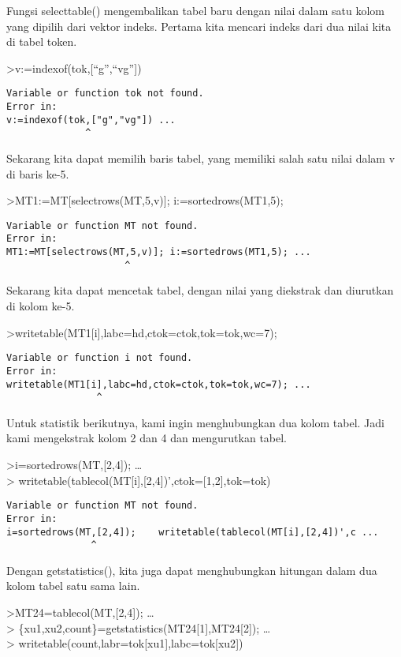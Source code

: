 \documentclass[
]{book}
\begin{document}
Fungsi selecttable() mengembalikan tabel baru dengan nilai dalam satu kolom yang dipilih dari vektor indeks. Pertama kita mencari indeks dari dua nilai kita di tabel token.

\textgreater v:=indexof(tok,{[}``g'',``vg''{]})

\begin{verbatim}
Variable or function tok not found.
Error in:
v:=indexof(tok,["g","vg"]) ...
              ^
\end{verbatim}

Sekarang kita dapat memilih baris tabel, yang memiliki salah satu nilai dalam v di baris ke-5.

\textgreater MT1:=MT{[}selectrows(MT,5,v){]}; i:=sortedrows(MT1,5);

\begin{verbatim}
Variable or function MT not found.
Error in:
MT1:=MT[selectrows(MT,5,v)]; i:=sortedrows(MT1,5); ...
                     ^
\end{verbatim}

Sekarang kita dapat mencetak tabel, dengan nilai yang diekstrak dan diurutkan di kolom ke-5.

\textgreater writetable(MT1{[}i{]},labc=hd,ctok=ctok,tok=tok,wc=7);

\begin{verbatim}
Variable or function i not found.
Error in:
writetable(MT1[i],labc=hd,ctok=ctok,tok=tok,wc=7); ...
                ^
\end{verbatim}

Untuk statistik berikutnya, kami ingin menghubungkan dua kolom tabel. Jadi kami mengekstrak kolom 2 dan 4 dan mengurutkan tabel.

\textgreater i=sortedrows(MT,{[}2,4{]}); \ldots{}\\
\textgreater{} writetable(tablecol(MT{[}i{]},{[}2,4{]})',ctok={[}1,2{]},tok=tok)

\begin{verbatim}
Variable or function MT not found.
Error in:
i=sortedrows(MT,[2,4]);    writetable(tablecol(MT[i],[2,4])',c ...
               ^
\end{verbatim}

Dengan getstatistics(), kita juga dapat menghubungkan hitungan dalam dua kolom tabel satu sama lain.

\textgreater MT24=tablecol(MT,{[}2,4{]}); \ldots{}\\
\textgreater{} \{xu1,xu2,count\}=getstatistics(MT24{[}1{]},MT24{[}2{]}); \ldots{}\\
\textgreater{} writetable(count,labr=tok{[}xu1{]},labc=tok{[}xu2{]})
\end{document}
